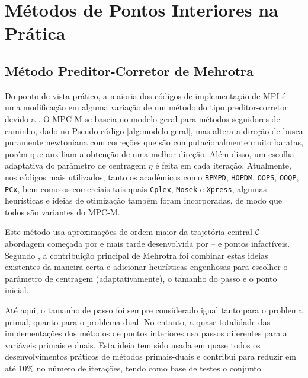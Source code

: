  
 

 


\section{Métodos de Pontos Interiores na Prática}

\subsection{Método Preditor-Corretor de Mehrotra}
\label{sec:mehrotra-pc-method}
Do ponto de vista prático, a maioria dos códigos de implementação de \ac{MPI}
é uma modificação em alguma variação de um método do tipo  preditor-corretor
 devido a \textcite{Mehrotra:1992wr}. O  \ac{MPC-M} se baseia no modelo geral
para métodos seguidores de caminho, dado no Pseudo-código
\ref{alg:modelo-geral}, mas altera a  direção de busca puramente newtoniana com
correções que são computacionalmente muito baratas,  porém que auxiliam a obtenção de uma
melhor direção. Além disso, um escolha adaptativa do parâmetro de centragem
$\eta$ é feita em cada iteração. Atualmente, nos códigos mais utilizados, tanto os
acadêmicos como \texttt{BPMPD}, \texttt{HOPDM}, \texttt{OOPS}, \texttt{OOQP},
\texttt{PCx}, bem como  os comerciais tais quais \texttt{Cplex}, \texttt{Mosek} e
\texttt{Xpress}, algumas heurísticas e ideias de otimização também foram
incorporadas, de modo que todos são variantes do \ac{MPC-M}.

Este método usa  aproximações de ordem maior da trajetória central $\mathcal{C}$ --
abordagem começada  por \textcite{Meggido:Pathways-to-the-optimal:1988u} e mais
tarde desenvolvida por
\textcite{Monteiro:1990vn} -- e pontos infactíveis. Segundo \textcite[pg
194]{Wright:Primal-dual-interior-point:1997h},  a contribuição principal
de Mehrotra foi combinar estas ideias existentes da maneira certa e adicionar
heurísticas engenhosas para escolher o parâmetro de centragem (adaptativamente), o tamanho
do passo e o ponto inicial.

Até aqui, o tamanho de passo foi sempre considerado igual tanto para o problema
primal, quanto para o problema dual. No entanto, a quase totalidade das
implementações dos métodos de pontos interiores usa passos diferentes para a variáveis
primais e duais. Esta ideia  tem sido usada em
quase todos os desenvolvimentos práticos de métodos primais-duais e  contribui
para reduzir em até 10\% no número de iterações, tendo como base de testes o
conjunto  \Netlib~\cite[pg.
195]{Wright:Primal-dual-interior-point:1997h}.

